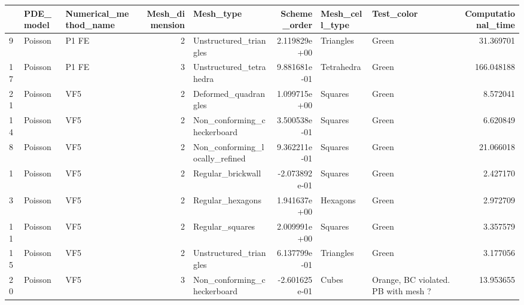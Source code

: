 \begin{tabular}{lllrlrllr}
\toprule
{} &         PDE\_model & Numerical\_method\_name &  Mesh\_dimension &                       Mesh\_type &  Scheme\_order &        Mesh\_cell\_type &                           Test\_color &  Computational\_time \\
\midrule
9  &           Poisson &                 P1 FE &               2 &          Unstructured\_triangles &  2.119829e+00 &             Triangles &                                Green &           31.369701 \\
17 &           Poisson &                 P1 FE &               3 &         Unstructured\_tetrahedra &  9.881681e-01 &            Tetrahedra &                                Green &          166.048188 \\
21 &           Poisson &                   VF5 &               2 &            Deformed\_quadrangles &  1.099715e+00 &               Squares &                                Green &            8.572041 \\
14 &           Poisson &                   VF5 &               2 &     Non\_conforming\_checkerboard &  3.500538e-01 &               Squares &                                Green &            6.620849 \\
8  &           Poisson &                   VF5 &               2 &  Non\_conforming\_locally\_refined &  9.362211e-01 &               Squares &                                Green &           21.066018 \\
1  &           Poisson &                   VF5 &               2 &               Regular\_brickwall & -2.073892e-01 &               Squares &                                Green &            2.427170 \\
3  &           Poisson &                   VF5 &               2 &                Regular\_hexagons &  1.941637e+00 &              Hexagons &                                Green &            2.972709 \\
11 &           Poisson &                   VF5 &               2 &                 Regular\_squares &  2.009991e+00 &               Squares &                                Green &            3.357579 \\
15 &           Poisson &                   VF5 &               2 &          Unstructured\_triangles &  6.137799e-01 &             Triangles &                                Green &            3.177056 \\
20 &           Poisson &                   VF5 &               3 &     Non\_conforming\_checkerboard & -2.601625e-01 &                 Cubes &  Orange, BC violated. PB with mesh ? &           13.953655 \\

\end{tabular}
